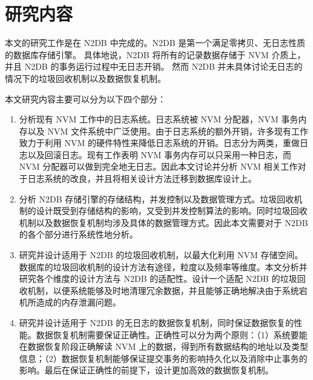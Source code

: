 



\section{研究内容}

本文的研究工作是在 N2DB 中完成的。N2DB 是第一个满足零拷贝、无日志性质的数据库存储引擎。
具体地说，N2DB 将所有的记录数据存储于 NVM 介质上，并且 N2DB 的事务运行过程中无日志开销。
然而 N2DB 并未具体讨论无日志的情况下的垃圾回收机制以及数据恢复机制。

本文研究内容主要可以分为以下四个部分：
\begin{enumerate}
    \item 分析现有 NVM 工作中的日志系统。日志系统被 NVM 分配器，NVM 事务内存以及 NVM 文件系统中广泛使用。由于日志系统的额外开销，许多现有工作致力于利用 NVM 的硬件特性来降低日志系统的开销。日志分为两类，重做日志以及回滚日志。现有工作表明 NVM 事务内存可以只采用一种日志，而 NVM 分配器可以做到完全地无日志。因此本文讨论并分析 NVM 相关工作对于日志系统的改良，并且将相关设计方法迁移到数据库设计上。
    \item 分析 N2DB 存储引擎的存储结构，并发控制以及数据管理方式。垃圾回收机制的设计既受到存储结构的影响，又受到并发控制算法的影响。同时垃圾回收机制以及数据恢复机制均涉及具体的数据管理方式。因此本文需要对于 N2DB 的各个部分进行系统性地分析。
    \item 研究并设计适用于 N2DB 的垃圾回收机制，以最大化利用 NVM 存储空间。数据库的垃圾回收机制的设计方法有途径，粒度以及频率等维度。本文分析并研究各个维度的设计方法与 N2DB 的适配性。设计一个适配 N2DB 的垃圾回收机制，以便系统能够及时地清理冗余数据，并且能够正确地解决由于系统宕机所造成的内存泄漏问题。
    \item 研究并设计适用于 N2DB 的无日志的数据恢复机制，同时保证数据恢复的性能。数据恢复机制需要保证正确性。正确性可以分为两个原则：（1）系统要能在数据恢复阶段正确解读 NVM 上的数据，得到所有数据结构的地址以及类型信息；（2）数据恢复机制能够保证提交事务的影响持久化以及消除中止事务的影响。最后在保证正确性的前提下，设计更加高效的数据恢复机制。
\end{enumerate}

